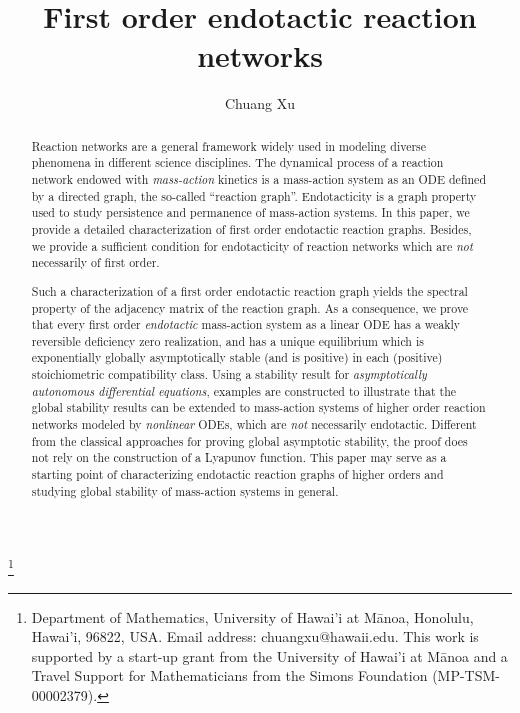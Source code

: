 \documentclass[10pt]{amsart}
\numberwithin{equation}{section}
\theoremstyle{plain}
\theoremstyle{definition}
\theoremstyle{remark}
\begin{document}
\title
  {First order endotactic reaction networks}
\author{Chuang Xu}\thanks{Department of Mathematics, University of Hawai'i at M\={a}noa, Honolulu, Hawai'i, 96822, USA. Email address: chuangxu@hawaii.edu. This work is supported by a start-up grant from the University of Hawai'i at M\={a}noa and a Travel Support for Mathematicians from the Simons Foundation (MP-TSM-00002379).}



\noindent


\begin{abstract}
Reaction networks are a general framework widely used in modeling diverse phenomena in different science disciplines. The dynamical process of a reaction network endowed with \emph{mass-action} kinetics is a mass-action system as an ODE defined by a directed graph, the so-called ``reaction graph''. Endotacticity is a graph property used to study persistence and permanence of mass-action systems. In this paper, we provide a detailed characterization of first order endotactic reaction graphs. Besides, we provide a sufficient condition for endotacticity of reaction networks which are \emph{not} necessarily of first order. 

Such a characterization of a first order endotactic reaction graph yields the spectral property of the adjacency matrix of the reaction graph. As a consequence, we prove that every first order \emph{endotactic} mass-action system as a linear ODE has a weakly reversible deficiency zero realization, and has a unique equilibrium which is exponentially globally asymptotically stable (and is positive) in each (positive) stoichiometric compatibility class. Using a stability result for \emph{asymptotically autonomous differential equations}, examples are constructed to illustrate that the global stability results can be extended to mass-action systems of higher order reaction networks modeled by \emph{nonlinear} ODEs, which are \emph{not} necessarily endotactic. 
{Different from the classical approaches for proving global asymptotic stability, the proof does not rely on the construction of a Lyapunov function.} 
This paper may serve as a starting point of characterizing endotactic reaction graphs of higher orders and studying global stability of mass-action systems in general.
\end{abstract}

\end{document}
